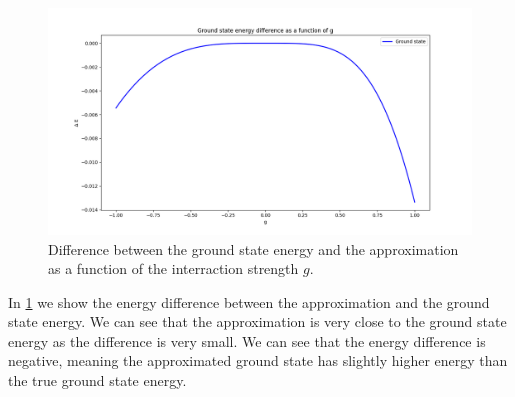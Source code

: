 \documentclass[a4paper,12pt]{article}
\begin{document}
\begin{figure}[h!]
    \centering
    \includegraphics[scale = 0.5]{Figure_5.png}
    \caption{Difference between the ground state energy and the approximation as a function of the interraction strength $g$.}
    \label{fig:fig5}
\end{figure}
In \ref{fig:fig5} we show the energy difference between the approximation and the ground state energy. We can see that the approximation is very close to the ground state energy as the difference is very small. We can see that the energy difference is negative, meaning the approximated ground state has slightly higher energy than the true ground state energy.\\
\end{document}
